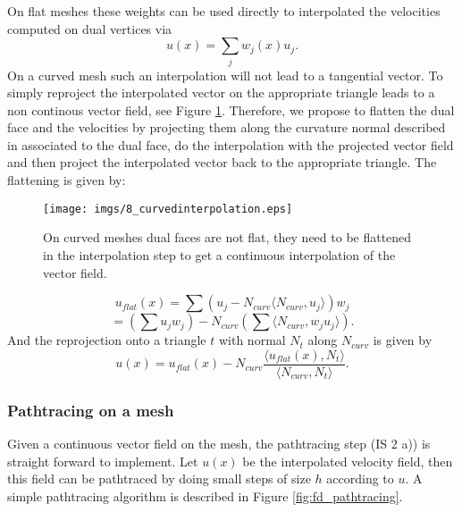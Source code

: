 On flat meshes these weights can be used directly to interpolated the velocities computed on dual vertices via
\[u(x) = \sum_{j} w_j(x) u_j.\] 
On a curved mesh such an interpolation will not lead to a tangential vector. To simply reproject the interpolated vector on the appropriate triangle leads to a non continous vector field, see Figure \ref{fig:fd_flatteninterpolation}. Therefore, we propose to  flatten  the dual face and the velocities by projecting them along the curvature normal described in \cite{laplacebeltrami} associated to the dual face, do the interpolation with the projected vector field and then project the interpolated vector back to the appropriate triangle. The flattening is given by:

\begin{figure}%
\begin{center}
\texttt{[image: imgs/8\_curvedinterpolation.eps]}%
\end{center}
\caption{On curved meshes dual faces are not flat, they need to be flattened in the interpolation step to get a continuous interpolation of the vector field.}%
\label{fig:fd_flatteninterpolation}%
\end{figure}


\[u_{flat}(x) = \sum (u_j - N_{curv} \langle N_{curv}, u_j \rangle) w_j\]
\[= (\sum u_j w_j )- N_{curv} (\sum \langle N_{curv}, w_j u_j \rangle).\]
And the reprojection onto a triangle $t$ with normal $N_t$ along $N_{curv}$ is given by
\[u(x) = u_{flat}(x) - N_{curv} \frac{\langle u_{flat}(x), N_{t}\rangle}{ \langle N_{curv}, N_t \rangle}.\]

\subsubsection{Pathtracing on a mesh}
Given a continuous vector field on the mesh, the pathtracing step (IS 2 a)) is straight forward to implement. Let $u(x)$ be the interpolated velocity field, then this field can be pathtraced by doing small steps of size $h$ according to $u$. A simple pathtracing algorithm is described in Figure \ref{fig:fd_pathtracing}. 

